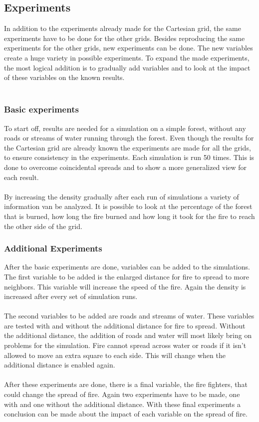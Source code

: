 \documentclass{article}
\begin{document}
\begin{multicols}{2}
\subsection*{Experiments}
In addition to the experiments already made for the Cartesian grid, the same experiments have to be done for the other grids. Besides reproducing the same experiments for the other grids, new experiments can be done. The new variables create a huge variety in possible experiments. To expand the made experiments, the most logical addition is to gradually add variables and to look at the impact of these variables on the known results.\\\\

\subsubsection*{Basic experiments}
To start off, results are needed for a simulation on a simple forest, without any roads or streams of water running through the forest. Even though the results for the Cartesian grid are already known the experiments are made for all the grids, to ensure consistency in the experiments. Each simulation is run 50 times. This is done to overcome coincidental spreads and to show a more generalized view for each result.\\\\
By increasing the density gradually after each run of simulations a variety of information van be analyzed. It is possible to look at the percentage of the forest that is burned, how long the fire burned and how long it took for the fire to reach the other side of the grid.

\subsubsection*{Additional Experiments}
After the basic experiments are done, variables can be added to the simulations. The first variable to be added is the enlarged distance for fire to spread to more neighbors. This variable will increase the speed of the fire. Again the density is increased after every set of simulation runs.\\\\
The second variables to be added are roads and streams of water. These variables are tested with and without the additional distance for fire to spread. Without the additional distance, the addition of roads and water will most likely bring on problems for the simulation. Fire cannot spread across water or roads if it isn't allowed to move an extra square to each side. This will change when the additional distance is enabled again.\\\\
After these experiments are done, there is a final variable, the fire fighters, that could change the spread of fire. Again two experiments have to be made, one with and one without the additional distance. With these final experiments a conclusion can be made about the impact of each variable on the spread of fire.


\end{multicols}
\end{document}
